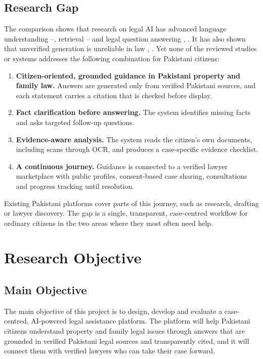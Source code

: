 \subsection{Research Gap}

The comparison shows that research on legal AI has advanced language understanding \cite{r2}--\cite{r4}, retrieval \cite{r11}--\cite{r13} and legal question answering \cite{r16}, \cite{r17}. It has also shown that unverified generation is unreliable in law \cite{r8}, \cite{r9}. Yet none of the reviewed studies or systems addresses the following combination for Pakistani citizens:

\begin{enumerate}
  \item \textbf{Citizen-oriented, grounded guidance in Pakistani property and family law.} Answers are generated only from verified Pakistani sources, and each statement carries a citation that is checked before display.
  \item \textbf{Fact clarification before answering.} The system identifies missing facts and asks targeted follow-up questions.
  \item \textbf{Evidence-aware analysis.} The system reads the citizen's own documents, including scans through OCR, and produces a case-specific evidence checklist.
  \item \textbf{A continuous journey.} Guidance is connected to a verified lawyer marketplace with public profiles, consent-based case sharing, consultations and progress tracking until resolution.
\end{enumerate}

Existing Pakistani platforms cover parts of this journey, such as research, drafting or lawyer discovery. The gap is a single, transparent, case-centred workflow for ordinary citizens in the two areas where they most often need help.

\section{Research Objective}

\subsection{Main Objective}

The main objective of this project is to design, develop and evaluate a case-centred, AI-powered legal assistance platform. The platform will help Pakistani citizens understand property and family legal issues through answers that are grounded in verified Pakistani legal sources and transparently cited, and it will connect them with verified lawyers who can take their case forward.

